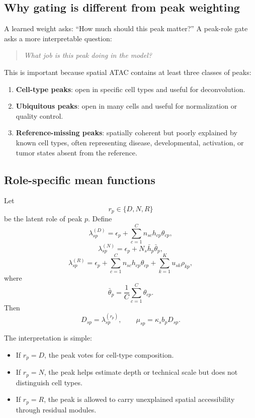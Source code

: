 \documentclass[11pt]{article}
\begin{document}
\subsection{Why gating is different from peak weighting}

A learned weight asks: ``How much should this peak matter?'' A peak-role gate asks a more interpretable question:

\begin{quote}
\textit{What job is this peak doing in the model?}
\end{quote}

This is important because spatial ATAC contains at least three classes of peaks:

\begin{enumerate}
    \item \textbf{Cell-type peaks}: open in specific cell types and useful for deconvolution.
    \item \textbf{Ubiquitous peaks}: open in many cells and useful for normalization or quality control.
    \item \textbf{Reference-missing peaks}: spatially coherent but poorly explained by known cell types, often representing disease, developmental, activation, or tumor states absent from the reference.
\end{enumerate}

\subsection{Role-specific mean functions}

Let
\[
r_p\in\{D,N,R\}
\]
be the latent role of peak $p$. Define
\[
\lambda_{sp}^{(D)}=\epsilon_p+\sum_{c=1}^C n_{sc}h_{cp}\theta_{cp},
\]
\[
\lambda_{sp}^{(N)}=\epsilon_p+N_s\bar{h}_p\bar{\theta}_p,
\]
\[
\lambda_{sp}^{(R)}=\epsilon_p+\sum_{c=1}^C n_{sc}h_{cp}\theta_{cp}+\sum_{k=1}^{K}u_{sk}\rho_{kp},
\]
where
\[
\bar{\theta}_p = \frac{1}{C}\sum_{c=1}^C\theta_{cp}.
\]
Then
\[
D_{sp}=\lambda_{sp}^{(r_p)},
\qquad
\mu_{sp}=\kappa_s b_p D_{sp}.
\]

The interpretation is simple:
\begin{itemize}
    \item If $r_p=D$, the peak votes for cell-type composition.
    \item If $r_p=N$, the peak helps estimate depth or technical scale but does not distinguish cell types.
    \item If $r_p=R$, the peak is allowed to carry unexplained spatial accessibility through residual modules.
\end{itemize}
\end{document}
